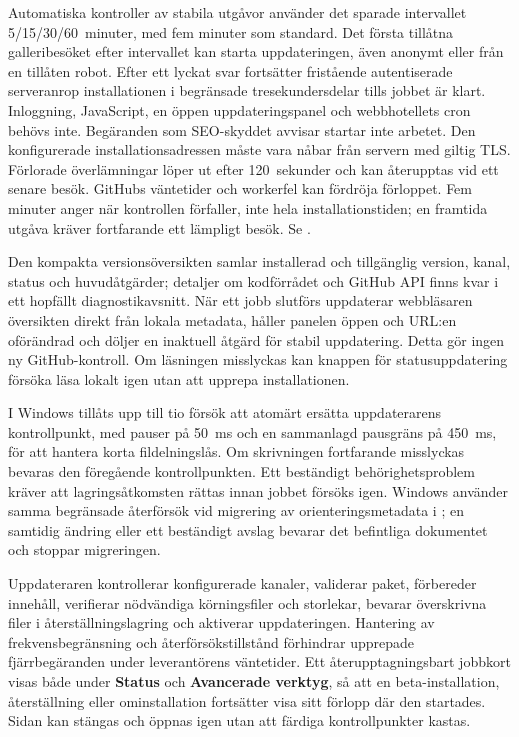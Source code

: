 \documentclass[11pt,a4paper]{article}
\newcommand{\filepath}[1]{\path{#1}}
\newcommand{\ui}[1]{\textbf{#1}}
\begin{document}
Automatiska kontroller av stabila utgåvor använder det sparade intervallet
5/15/30/60~minuter, med fem minuter som standard. Det första tillåtna
galleribesöket efter intervallet kan starta uppdateringen, även anonymt eller
från en tillåten robot. Efter ett lyckat svar fortsätter fristående
autentiserade serveranrop installationen i begränsade tresekundersdelar tills
jobbet är klart. Inloggning, JavaScript, en öppen uppdateringspanel och
webbhotellets cron behövs inte. Begäranden som SEO-skyddet avvisar startar inte
arbetet. Den konfigurerade installationsadressen måste vara nåbar från servern
med giltig TLS. Förlorade överlämningar löper ut efter 120~sekunder och kan
återupptas vid ett senare besök. GitHubs väntetider och workerfel kan fördröja
förloppet. Fem minuter anger när kontrollen förfaller, inte hela
installationstiden; en framtida utgåva kräver fortfarande ett lämpligt besök.
Se \filepath{docs/AUTOUPDATE.md}.

Den kompakta versionsöversikten samlar installerad och tillgänglig version,
kanal, status och huvudåtgärder; detaljer om kodförrådet och GitHub API finns
kvar i ett hopfällt diagnostikavsnitt. När ett jobb slutförs uppdaterar
webbläsaren översikten direkt från lokala metadata, håller panelen öppen och
URL:en oförändrad och döljer en inaktuell åtgärd för stabil uppdatering. Detta
gör ingen ny GitHub-kontroll. Om läsningen misslyckas kan knappen för
statusuppdatering försöka läsa lokalt igen utan att upprepa installationen.

I Windows tillåts upp till tio försök att atomärt ersätta uppdaterarens
kontrollpunkt, med pauser på 50~ms och en sammanlagd pausgräns på 450~ms, för
att hantera korta fildelningslås. Om skrivningen fortfarande misslyckas bevaras
den föregående kontrollpunkten. Ett beständigt behörighetsproblem kräver att
lagringsåtkomsten rättas innan jobbet försöks igen. Windows använder samma
begränsade återförsök vid migrering av orienteringsmetadata i
\filepath{gallery.json}; en samtidig ändring eller ett beständigt avslag bevarar
det befintliga dokumentet och stoppar migreringen.

Uppdateraren kontrollerar konfigurerade kanaler, validerar paket, förbereder
innehåll, verifierar nödvändiga körningsfiler och storlekar, bevarar överskrivna
filer i återställningslagring och aktiverar uppdateringen. Hantering av
frekvensbegränsning och återförsökstillstånd förhindrar upprepade
fjärrbegäranden under leverantörens väntetider. Ett återupptagningsbart jobbkort
visas både under \ui{Status} och \ui{Avancerade verktyg}, så att en
beta-installation, återställning eller ominstallation fortsätter visa sitt
förlopp där den startades. Sidan kan stängas och öppnas igen utan att färdiga
kontrollpunkter kastas.
\end{document}
